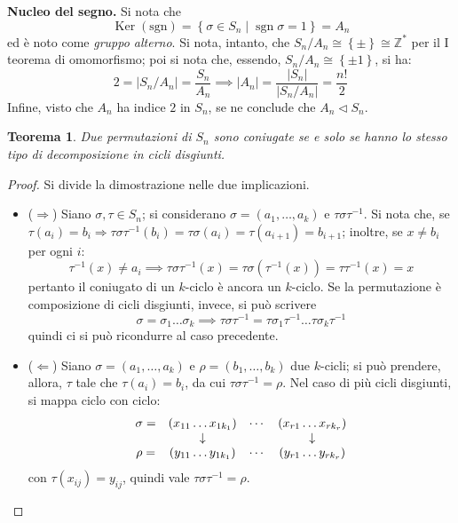\documentclass[12pt]{scrartcl}
\theoremstyle{style}
\newtheorem{teorema}{Teorema}[section]
\numberwithin{equation}{subsection}
\begin{document}
\textbf{Nucleo del segno.} 
Si nota che 
\begin{equation}
	\operatorname{Ker} (\mathrm{sgn}) = \left\{ \sigma \in S_n  \mid \operatorname{sgn} \sigma  = 1\right\} = A_n
\end{equation}
ed \`e noto come \textit{gruppo alterno}. 
Si nota, intanto, che $S_n / A_n \cong \left\{ \pm \right\} \cong \mathbb{Z}^*$ per il I teorema di omomorfismo; poi si nota che, essendo, $S_n / A_n\cong \left\{ \pm 1 \right\} $, si ha:
\[
2 = \lvert S_n / A_n \rvert = \frac{S_n}{A_n} \implies \lvert A_n \rvert = \frac{\lvert S_n \rvert }{\lvert S_n / A_n \rvert } = \frac{n!}{2}
\] 
Infine, visto che $A_n$ ha indice $2$ in $S_n$, se ne conclude che $A_ n \lhd S_n$.
\vspace{5pt}

\begin{teorema}
	Due permutazioni di $S_n$ sono coniugate se e solo se hanno lo stesso tipo di decomposizione in cicli disgiunti.
\end{teorema}
	\begin{proof}
		Si divide la dimostrazione nelle due implicazioni.
		\begin{itemize}
			\item ($\Rightarrow $) Siano $\sigma , \tau \in S_n$; si considerano $\sigma = (a_1, \ldots, a_k)$ e $\tau \sigma \tau ^{-1}$.
				Si nota che, se $\tau (a_i) = b_i\Rightarrow \tau \sigma \tau ^{-1}(b_i) = \tau \sigma (a_i) = \tau (a_{i+1} ) =b_{i+1} $; inoltre, se $x \neq b_i $ per ogni $i$:
				\[
				\tau ^{-1}(x) \neq a_i \implies \tau \sigma \tau ^{-1}(x) = \tau \sigma \left(\tau ^{-1}(x)\right) =\tau \tau ^{-1}(x) = x
				\] 
				pertanto il coniugato di un $k$-ciclo \`e ancora un $k$-ciclo.
				Se la permutazione \`e composizione di cicli disgiunti, invece, si pu\`o scrivere 
				\[
				\sigma = \sigma _1 \ldots\sigma _k \implies \tau \sigma \tau ^{-1}= \tau \sigma _1\tau ^{-1}\ldots \tau \sigma _k\tau ^{-1}
				\] 
				quindi ci si pu\`o ricondurre al caso precedente.
			\item ($\Leftarrow$) Siano $\sigma  = (a_1,\ldots,a_k)$ e $\rho =(b_1,\ldots,b_k)$ due $k$-cicli; si pu\`o prendere, allora, $\tau $ tale che $\tau (a_i) = b_i$, da cui $\tau \sigma \tau ^{-1}=\rho $. 
				Nel caso di pi\`u cicli disgiunti, si mappa ciclo con ciclo:
				\[
				\begin{array}
					{c c c c}
					\sigma = &(x_{11} \ldots x_{1k_1} )&\cdots & (x_{r1} \ldots x_{rk_r} )\\
						 &\downarrow &  & \downarrow\\
					\rho = &(y_{11} \ldots y_{1k_1} ) & \cdots & (y_{r1} \ldots y_{r k_r} )
				\end{array}
				\] 
				con $\tau (x_{ij} ) = y_{ij} $, quindi vale $\tau \sigma \tau ^{-1}=\rho $.
		\end{itemize}
	\end{proof}
\end{document}
